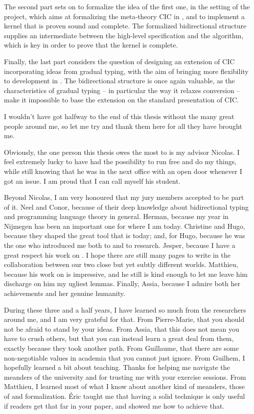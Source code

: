 The second part sets on to formalize the idea of the first one,
in the setting of the  project,
which aims at formalizing the meta-theory CIC in , and to implement
a kernel that is proven sound and complete. The formalized bidirectional structure supplies
an intermediate between the high-level specification and the algorithm, which is key in
order to prove that the kernel is complete.

Finally, the last part considers the question of designing an extension of CIC incorporating
ideas from gradual typing, with the aim of bringing more flexibility to development in .
The bidirectional structure is once again valuable, as the characteristics of gradual typing
– in particular the way it relaxes conversion – 
make it impossible to base the extension on the standard presentation of CIC.


I wouldn’t have got halfway to the end of this thesis without the many great people around me,
so let me try and thank them here for all they have brought me.

Obviously, the one person this thesis owes the most to is my advisor Nicolas. I feel extremely
lucky to have had the possibility to run free and do my things, while still knowing that
he was in the next office with an open door whenever I got an issue.
I am proud that I can call myself his student.

Beyond Nicolas, I am very honoured that my jury members accepted to be part of it.
Neel and Conor,
because of their deep knowledge about bidirectional typing and programming language
theory in general.
Herman, because my year in Nijmegen has been an important one for where I am today.
Christine and Hugo, because they shaped the great tool that  is today; and, for Hugo,
because he was the one who introduced me both to  and to research.
Jesper, because I have a great respect his work on .
I hope there are still many pages to
write in the collaboration between our two close but yet subtly different worlds.
Matthieu, because his work on  is impressive, and he still is kind enough to
let me leave him discharge on him my ugliest lemmas.
Finally, Assia, because I admire both her achievements and her genuine humanity.

During these three and a half years, I have learned so much from the researchers around me,
and I am very grateful for that.
From Pierre-Marie, that you should not be afraid to stand by your ideas.
From Assia, that this does not mean you have to crush others,
but that you can instead learn a great deal from them, exactly because they took another path.
From Guillaume, that there are some non-negotiable values in academia that you cannot just 
ignore.
From Guilhem, I hopefully learned a bit about teaching. Thanks for helping me navigate the
meanders of the university and for trusting me with your exercise sessions.
From Matthieu, I learned most of what I know about another kind of meanders,
those of  and formalization.
Éric taught me that having a solid technique
is only useful if readers get that far in your paper, and showed me how to achieve that.

